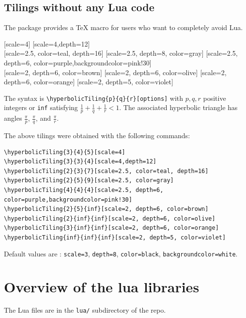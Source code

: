 \documentclass{article}
\begin{document}
\subsection{Tilings without any Lua code}

The package provides a TeX macro for users who want to completely avoid  Lua. 
\bigskip

\noindent
{}[scale=4]\hfill
{}[scale=4,depth=12]
\\
[scale=2.5, color=teal, depth=16]\hfill
{}[scale=2.5, depth=8, color=gray]\hfill
{}[scale=2.5, depth=6, color=purple,backgroundcolor=pink!30]
\\
[scale=2, depth=6, color=brown]\hfill
{}[scale=2, depth=6, color=olive]\hfill
{}[scale=2, depth=6, color=orange]\hfill
{}[scale=2, depth=5, color=violet]

The syntax is \verb+\hyperbolicTiling{p}{q}{r}[options]+ with $p, q, r$ positive integers or  \texttt{inf} satisfying $\frac1p + \frac1q+\frac1r < 1$. The associated hyperbolic triangle has angles $\frac{\pi}{p}$, $\frac{\pi}{q}$,  and $\frac{\pi}{r}$. 

The above tilings were obtained with the following commands:
\begin{verbatim}
\hyperbolicTiling{3}{4}{5}[scale=4]
\hyperbolicTiling{3}{3}{4}[scale=4,depth=12]
\hyperbolicTiling{2}{3}{7}[scale=2.5, color=teal, depth=16]
\hyperbolicTiling{2}{5}{9}[scale=2.5, color=gray]
\hyperbolicTiling{4}{4}{4}[scale=2.5, depth=6, color=purple,backgroundcolor=pink!30]
\hyperbolicTiling{2}{5}{inf}[scale=2, depth=6, color=brown]
\hyperbolicTiling{2}{inf}{inf}[scale=2, depth=6, color=olive]
\hyperbolicTiling{3}{inf}{inf}[scale=2, depth=6, color=orange]
\hyperbolicTiling{inf}{inf}{inf}[scale=2, depth=5, color=violet]
\end{verbatim}
Default values are : \texttt{scale=3}, \texttt{depth=8}, \texttt{color=black}, \texttt{backgroundcolor=white}.





\section{Overview of the lua libraries}

The Lua files are in the \verb+lua/+ subdirectory of the repo.
\end{document}
